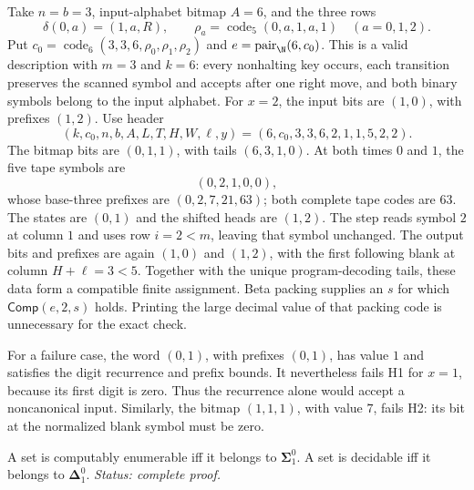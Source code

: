 \begin{example}
Take \(n=b=3\), input-alphabet bitmap \(A=6\), and the three rows
\[
 \delta(0,a)=(1,a,R),\qquad
 \rho_a=\operatorname{code}_5(0,a,1,a,1)\quad(a=0,1,2).
\]
Put \(c_0=\operatorname{code}_6(3,3,6,\rho_0,\rho_1,\rho_2)\)
and \(e=\operatorname{pair}_{\N}(6,c_0)\).  This is a valid
description with \(m=3\) and \(k=6\): every nonhalting key occurs,
each transition preserves the scanned symbol and accepts after
one right move, and both binary symbols belong to the input alphabet.
For \(x=2\), the input bits are \((1,0)\), with prefixes \((1,2)\).
Use header
\[
 (k,c_0,n,b,A,L,T,H,W,\ell,y)
       =(6,c_0,3,3,6,2,1,1,5,2,2).
\]
The bitmap bits are \((0,1,1)\), with tails \((6,3,1,0)\).
At both times \(0\) and \(1\), the five tape symbols are
\[
 (0,2,1,0,0),
\]
whose base-three prefixes are \((0,2,7,21,63)\); both complete
tape codes are \(63\).  The states are \((0,1)\) and the shifted
heads are \((1,2)\).  The step reads symbol \(2\) at column \(1\)
and uses row \(i=2<m\), leaving that symbol unchanged.
The output bits and prefixes are again \((1,0)\) and \((1,2)\),
with the first following blank at column \(H+\ell=3<5\).
Together with the unique program-decoding tails, these data form
a compatible finite assignment.  Beta packing supplies an \(s\)
for which \(\mathsf{Comp}(e,2,s)\) holds.  Printing the large
decimal value of that packing code is unnecessary for the exact check.

For a failure case, the word \((0,1)\), with prefixes \((0,1)\),
has value \(1\) and satisfies the digit recurrence and prefix bounds.
It nevertheless fails H1 for \(x=1\), because its first digit is
zero.  Thus the recurrence alone would accept a noncanonical input.
Similarly, the bitmap \((1,1,1)\), with value \(7\), fails H2:
its bit at the normalized blank symbol must be zero.
\end{example}

\begin{theorem}
\label{thm:p04-ce-sigma-one}
A set is computably enumerable iff it belongs to
\(\boldsymbol{\Sigma}^0_1\).  A set is decidable iff it belongs to
\(\boldsymbol{\Delta}^0_1\).
\textit{Status: complete proof.}
\end{theorem}

